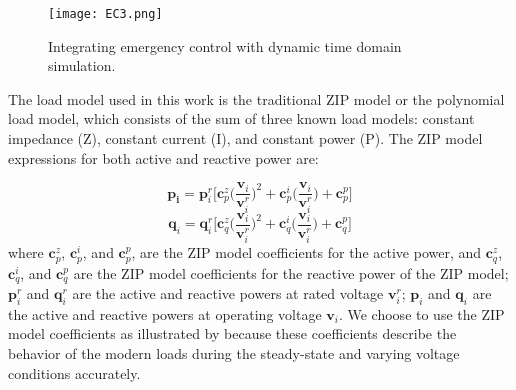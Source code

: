 \documentclass[journal]{IEEEtran}
\begin{document}
\begin{figure}[!t]
\centering
\texttt{[image: EC3.png]}
\caption{Integrating emergency control with dynamic time domain simulation.}
\label{fig: EC}
\end{figure}
	




The load model used in this work is the traditional ZIP model or the polynomial load model, which consists of the sum of three known load models: constant impedance (Z), constant current (I), and constant power (P). The ZIP model expressions for both active and reactive power are:


\begin{equation}
\label{E16}
\mathbf{p_i}=\mathbf{p}^{r}_i \bigg[\mathbf{c}_p^z \Big( \frac{\mathbf{v}_i}{ \mathbf{v}^{r}_i}\Big)^2+\mathbf{c}_p^i\Big( \frac{\mathbf{v}_i}{ \mathbf{v}^{r}_i}\Big)+\mathbf{c}_p^p \bigg]
\end{equation}
\begin{equation}
\label{E17}
\mathbf{q}_i=\mathbf{q}^{r}_i \bigg[\mathbf{c}_q^z \Big( \frac{\mathbf{v}_i}{ \mathbf{v}^{r}_i}\Big)^2+\mathbf{c}_q^i\Big( \frac{\mathbf{v}_i}{ \mathbf{v}^{r}_i}\Big)+\mathbf{c}_q^p \bigg]
\end{equation}          
where $\mathbf{c}_p^z $, $\mathbf{c}_p^i $, and $\mathbf{c}_p^p$, are the ZIP model coefficients for the active power, and $\mathbf{c}_q^z $, $\mathbf{c}_q^i $, and $\mathbf{c}_q^p $  are the ZIP model coefficients for the reactive power of the ZIP model;  $\mathbf{p}^{r}_i $ and $\mathbf{q}^{r}_i $ are the active and reactive powers at rated voltage $\mathbf{v}^{r}_i $; $\mathbf{p}_i $ and $\mathbf{q}_i $ are the active and reactive powers at operating voltage $\mathbf{v}_i $. We choose to use the ZIP model coefficients as illustrated by %
\cite{ZIP_COFF} because these coefficients describe the behavior of the modern loads during the steady-state and varying voltage conditions accurately. %
\end{document}
